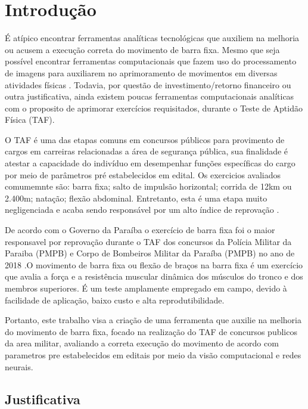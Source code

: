 \chapter{Introdução}

É atípico encontrar ferramentas analíticas tecnológicas que auxiliem na melhoria ou acusem a execução correta do movimento de barra fixa. Mesmo que seja possível encontrar ferramentas computacionais que fazem uso  do processamento de imagens para auxiliarem no aprimoramento de movimentos em diversas atividades físicas \cite{vcBicicleta} \cite{vcFutebol} \cite{futebolTatica}. Todavia, por questão de investimento/retorno financeiro ou outra justificativa, ainda existem poucas ferramentas computacionais analíticas com o proposito de aprimorar exercícios requisitados, durante o Teste de Aptidão Física (TAF).

O TAF é uma das etapas comuns em concursos públicos para provimento de cargos em carreiras relacionadas a área de segurança pública, sua finalidade é atestar a capacidade do indivíduo em desempenhar funções específicas do cargo por meio de parâmetros pré estabelecidos em edital. Os exercicios avaliados comumemnte são: barra fixa; salto de impulsão horizontal; corrida de 12km ou 2.400m; natação; flexão abdominal. Entretanto, esta é uma etapa muito negligenciada e acaba sendo responsável por um alto índice de reprovação \cite{reprovaTAF}.

De acordo com o Governo da Paraíba o exercício de barra fixa foi o maior responsavel por reprovação durante o TAF dos concursos  da Polícia Militar da Paraiba (PMPB) e Corpo de Bombeiros Militar da Paraíba (PMPB) no ano de 2018 \cite{barraTAF}.O movimento de barra fixa ou flexão de braços na barra fixa é um exercício que avalia a força e a resistência muscular dinâmica dos músculos do tronco e dos membros superiores. É um teste amplamente empregado em campo, devido à facilidade de aplicação, baixo custo e alta reprodutibilidade\cite{barraFixa}. 

Portanto, este trabalho visa a criação de uma ferramenta que auxilie na melhoria do movimento de barra fixa, focado na realização do TAF de concursos publicos da area militar, avaliando a correta execução do movimento de acordo com parametros pre estabelecidos em editais por meio da visão computacional e redes neurais.

\section{Justificativa}


